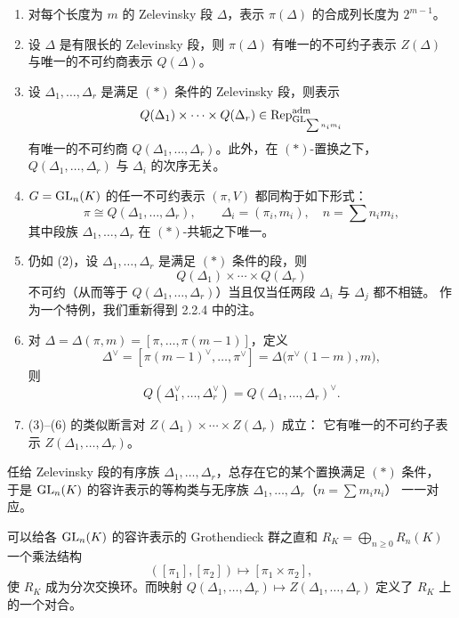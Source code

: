 \begin{theorem}
\leavevmode
\begin{enumerate}[label=(\arabic*),leftmargin=2.2em]
\item 对每个长度为 $m$ 的 Zelevinsky 段 $\Delta$，表示 $\pi(\Delta)$ 的合成列长度为 $2^{m-1}$。
\item 设 $\Delta$ 是有限长的 Zelevinsky 段，则 $\pi(\Delta)$ 有唯一的不可约子表示 $Z(\Delta)$
      与唯一的不可约商表示 $Q(\Delta)$。
\item 设 $\Delta_1,\dots,\Delta_r$ 是满足 $(*)$ 条件的 Zelevinsky 段，则表示
\[
Q(\Delta_1)\times\cdots\times Q(\Delta_r)\in\mathrm{Rep}^{\mathrm{adm}}_{\mathrm{GL}_{\sum n_im_i}}
\]
有唯一的不可约商 $Q(\Delta_1,\dots,\Delta_r)$。此外，在 $(*)$-置换之下，
$Q(\Delta_1,\dots,\Delta_r)$ 与 $\Delta_i$ 的次序无关。
\item $G=\mathrm{GL}_n(K)$ 的任一不可约表示 $(\pi,V)$ 都同构于如下形式：
\[
\pi\cong Q(\Delta_1,\dots,\Delta_r),
\qquad
\Delta_i=(\pi_i,m_i),\quad n=\sum n_im_i,
\]
其中段族 $\Delta_1,\dots,\Delta_r$ 在 $(*)$-共轭之下唯一。
\item 仍如 (2)，设 $\Delta_1,\dots,\Delta_r$ 是满足 $(*)$ 条件的段，则
\[
Q(\Delta_1)\times\cdots\times Q(\Delta_r)
\]
不可约（从而等于 $Q(\Delta_1,\dots,\Delta_r)$）当且仅当任两段 $\Delta_i$ 与 $\Delta_j$ 都不相链。
作为一个特例，我们重新得到 2.2.4 中的注。
\item 对 $\Delta=\Delta(\pi,m)=[\pi,\dots,\pi(m-1)]$，定义
\[
\Delta^{\vee}=[\pi(m-1)^{\vee},\dots,\pi^{\vee}]=\Delta\bigl(\pi^{\vee}(1-m),m\bigr),
\]
则
\[
Q(\Delta_1^{\vee},\dots,\Delta_r^{\vee})=Q(\Delta_1,\dots,\Delta_r)^{\vee}.
\]
\item (3)--(6) 的类似断言对 $Z(\Delta_1)\times\cdots\times Z(\Delta_r)$ 成立：
      它有唯一的不可约子表示 $Z(\Delta_1,\dots,\Delta_r)$。
\end{enumerate}
\end{theorem}

\begin{remark}
任给 Zelevinsky 段的有序族 $\Delta_1,\dots,\Delta_r$，总存在它的某个置换满足 $(*)$ 条件，
于是 $\mathrm{GL}_n(K)$ 的容许表示的等构类与无序族 $\Delta_1,\dots,\Delta_r$（$n=\sum m_in_i$）
一一对应。
\end{remark}

\begin{remark}
可以给各 $\mathrm{GL}_n(K)$ 的容许表示的 Grothendieck 群之直和 $R_K=\bigoplus_{n\ge 0}R_n(K)$
一个乘法结构
\[
([\pi_1],[\pi_2])\longmapsto[\pi_1\times\pi_2],
\]
使 $R_K$ 成为分次交换环。而映射 $Q(\Delta_1,\dots,\Delta_r)\mapsto
Z(\Delta_1,\dots,\Delta_r)$ 定义了 $R_K$ 上的一个对合。
\end{remark}

